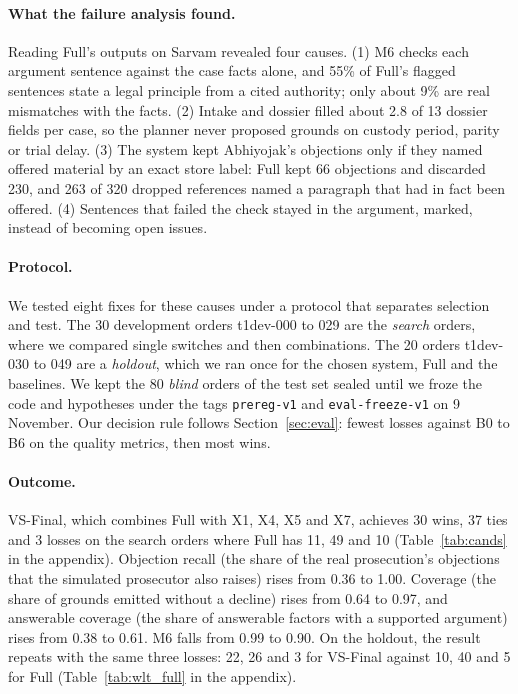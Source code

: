 \documentclass[11pt]{article}
\let\vsaddcontentsline\addcontentsline
\let\addcontentsline\vsaddcontentsline
\newcommand{\vs}{VS-Final}
\def\vsstrip#1.\vsend{#1}
\newcommand{\para}[1]{\paragraph{#1}\addcontentsline{toc}{subsection}{\vsstrip#1\vsend}}
\begin{document}
\para{What the failure analysis found.} Reading Full's outputs on Sarvam revealed four causes. (1) M6 checks each argument sentence against the case facts alone, and 55\% of Full's flagged sentences state a legal principle from a cited authority; only about 9\% are real mismatches with the facts. (2) Intake and dossier filled about 2.8 of 13 dossier fields per case, so the planner never proposed grounds on custody period, parity or trial delay. (3) The system kept Abhiyojak's objections only if they named offered material by an exact store label: Full kept 66 objections and discarded 230, and 263 of 320 dropped references named a paragraph that had in fact been offered. (4) Sentences that failed the check stayed in the argument, marked, instead of becoming open issues.

\para{Protocol.} We tested eight fixes for these causes under a protocol that separates selection and test. The 30 development orders t1dev-000 to 029 are the \emph{search} orders, where we compared single switches and then combinations. The 20 orders t1dev-030 to 049 are a \emph{holdout}, which we ran once for the chosen system, Full and the baselines. We kept the 80 \emph{blind} orders of the test set sealed until we froze the code and hypotheses under the tags \texttt{prereg-v1} and \texttt{eval-freeze-v1} on 9 November. Our decision rule follows Section~\ref{sec:eval}: fewest losses against B0 to B6 on the quality metrics, then most wins.


\para{Outcome.} \vs{}, which combines Full with X1, X4, X5 and X7, achieves 30 wins, 37 ties and 3 losses on the search orders where Full has 11, 49 and 10 (Table~\ref{tab:cands} in the appendix). Objection recall (the share of the real prosecution's objections that the simulated prosecutor also raises) rises from 0.36 to 1.00. Coverage (the share of grounds emitted without a decline) rises from 0.64 to 0.97, and answerable coverage (the share of answerable factors with a supported argument) rises from 0.38 to 0.61. M6 falls from 0.99 to 0.90. On the holdout, the result repeats with the same three losses: 22, 26 and 3 for \vs{} against 10, 40 and 5 for Full (Table~\ref{tab:wlt_full} in the appendix).
\end{document}
